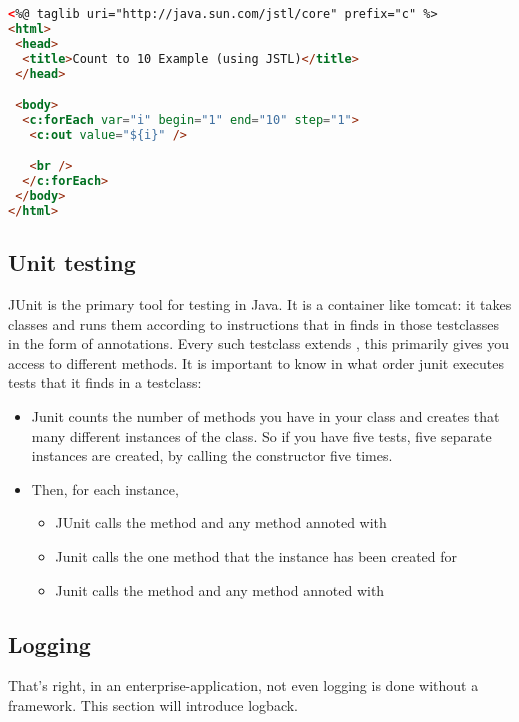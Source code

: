  \begin{lstlisting}[language=html]
 <%@ taglib uri="http://java.sun.com/jstl/core" prefix="c" %>
<html>
 <head>
  <title>Count to 10 Example (using JSTL)</title>
 </head>

 <body>
  <c:forEach var="i" begin="1" end="10" step="1">
   <c:out value="${i}" />

   <br />
  </c:forEach>
 </body>
</html>
 \end{lstlisting}
 
 
 
 
 \subsection{Unit testing}
 JUnit is the primary tool for testing in Java. It is a container like tomcat: it takes classes and runs them according to instructions that in finds in those testclasses in the form of annotations.  Every such testclass extends , this primarily gives you access to different  methods. 
 It is important to know in what order junit executes tests that it finds in a testclass: 
 \begin{itemize}
     \item Junit counts the number of  methods you have in your class and creates that many different instances of the class. So if you have five tests, five separate instances are created, by calling the constructor five times. 
     \item Then, for each instance, 
        \begin{itemize}
            \item JUnit calls the method  and any method annoted with 
            \item Junit calls the one  method that the instance has been created for
            \item Junit calls the method  and any method annoted with 
        \end{itemize}
 \end{itemize}
 
 
 
 \subsection{Logging}
 That's right, in an enterprise-application, not even logging is done without a framework. This section will introduce logback. 
 
